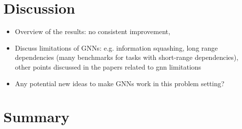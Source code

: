 \documentclass[english, 12pt, a4paper, sci, utf8, a-2b, online]{aaltothesis}
\begin{document}
\clearpage
\section{Discussion}
\begin{itemize}
    \item Overview of the results: no consistent improvement, 
    \item Discuss limitations of GNNs: e.g. information squashing, long range dependencies (many benchmarks for tasks with short-range dependencies), other points discussed in the papers related to gnn limitations
    \item Any potential new ideas to make GNNs work in this problem setting?
\end{itemize} 

\clearpage
\section{Summary}
\label{sec:summary}

\clearpage
\thesisbibliography

 
%  



\clearpage
\thesisappendix
\end{document}
